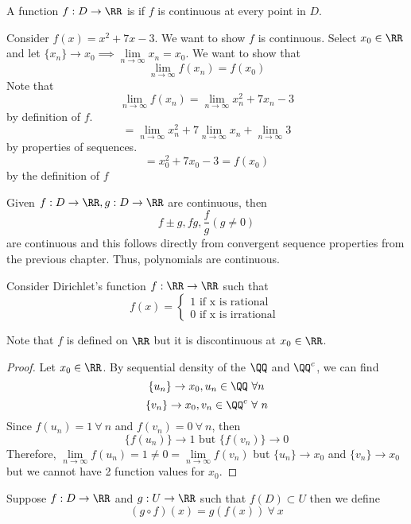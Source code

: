 \documentclass[12pt]{scrartcl}
\begin{document}
\begin{definition}
  A function $f: D \to \RR$ is  if $f$ is continuous at every point 
  in $D$.
\end{definition}

\begin{example}
  Consider $f(x) = x^2 + 7x - 3$. We want to show $f$ is continuous. Select 
  $x_0 \in \RR$ and let $\{x_n\} \to x_0 \implies \underset{n\to\infty}{\lim}x_n = x_0$.
  We want to show that 
  \[\lim_{n\to\infty}f(x_n) = f(x_0)\] 
  Note that 
  \[\underset{n\to\infty}{\lim}f(x_n) = \underset{n\to\infty}{\lim}x_n^2 + 7x_n -3\]
  by definition of $f$. 
  \[ = \lim_{n\to\infty}x_n^2 + 7\lim_{n\to\infty}x_n + \lim_{n\to\infty}3\]
  by properties of sequences. 
  \[= x_0^2 + 7x_0 - 3 = f(x_0)\]
  by the definition of $f$
\end{example}

\begin{remark}
  Given $f: D \to \RR, g: D \to \RR$ are continuous, then \[f \pm g, fg, \frac{f}{g} (g \neq 0)\] are continuous
  and this follows directly from convergent sequence properties from the previous chapter.
  Thus, polynomials are continuous. 

\end{remark}

\begin{example}
  Consider Dirichlet's function $f: \RR \to \RR$ such that 
  \[f(x) = \begin{cases}
    1 \text{ if x is rational }\\
    0 \text{ if x is irrational }
  \end{cases}\]

  Note that $f$ is defined on $\RR$ but it is discontinuous at $x_0 \in \RR$.

  \begin{proof}
    Let $x_0 \in \RR$. By sequential density of the $\QQ$ and $\QQ^c$, we can find 
    \[\{u_n\} \to x_0, u_n \in \QQ \ \forall n\]
    \[\{v_n\} \to x_0 , v_n \in \QQ^c \ \forall \ n\]
    Since $f(u_n) = 1 \ \forall \ n$ and $f(v_n) = 0 \ \forall \ n$, then 
    \[\{f(u_n)\} \to 1 \text{ but } \{f(v_n)\} \to 0\]
    Therefore, $\underset{n\to\infty}{\lim}f(u_n) = 1 \neq 0 = \underset{n\to\infty}{\lim}f(v_n)$
    but $\{u_n\} \to x_0$ and $\{v_n\} \to x_0$ but we cannot have 2 function values for $x_0$.
  \end{proof}
\end{example}

\begin{definition}
  Suppose $f: D \to \RR$ and $g: U \to \RR$ such that $f(D) \subset U$ then we define 
  \[(g \circ f)(x) = g(f(x)) \ \forall \ x\]
\end{definition}
\end{document}
